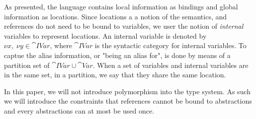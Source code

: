 \documentclass{llncs}
\begin{document}
As presented, the language contains local information as bindings and global information as locations.
Since locations a a notion of the semantics, and references do not need to be bound to variables, we user the notion of \emph{internal} variables to represent locations.
An internal variable is denoted by $\nu x,\; \nu y\in\cat{IVar}$, where $\cat{IVar}$ is the syntactic category for internal variables.
To captue the alias information, or "being an alias for", is done by means of a partition set of $\cat{IVar} \cup \cat{Var}$.
When a set of variables and internal variables are in the same set, in a partition, we say that they share the same location.





In this paper, we will not introduce polymorphism into the type system.
As such we will introduce the constraints that references cannot be bound to abstractions and every abstractions can at most be used once.
\end{document}
